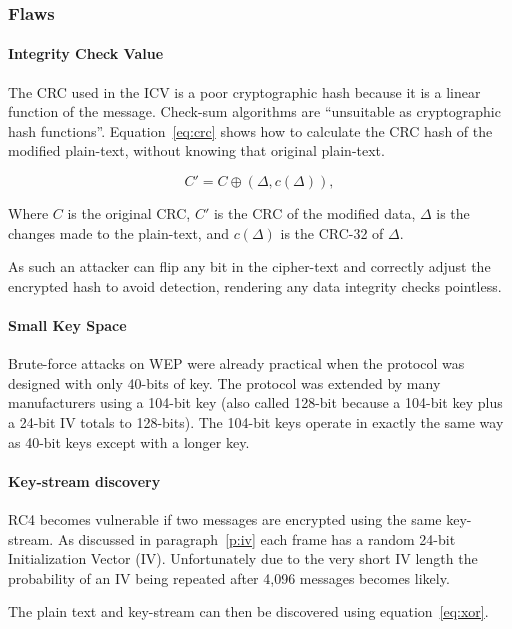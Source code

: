 \documentclass[pdftex, 12pt, a4paper]{article}
\begin{document}
\subsubsection{Flaws}

\paragraph{Integrity Check Value}
The CRC used in the ICV is a poor cryptographic hash because it is a linear function of the message. Check-sum algorithms are ``unsuitable as cryptographic hash functions''\cite{wiki-crc}. Equation~\ref{eq:crc} shows how to calculate the CRC hash of the modified plain-text, without knowing that original plain-text.

\begin{equation}\label{eq:crc}
C'=C \oplus (\Delta ,c(\Delta)),
\end{equation}

Where $C$ is the original CRC, $C'$ is the CRC of the modified data, $\Delta$ is the changes made to the plain-text, and $c(\Delta)$ is the CRC-32 of $\Delta$.

As such an attacker can flip any bit in the cipher-text and correctly adjust the encrypted hash to avoid detection, rendering any data integrity checks pointless.

\paragraph{Small Key Space}
Brute-force attacks on WEP were already practical when the protocol was designed with only 40-bits of key.  The protocol was extended by many manufacturers using a 104-bit key (also called 128-bit because a 104-bit key plus a 24-bit IV totals to 128-bits).  The 104-bit keys operate in exactly the same way as 40-bit keys except with a longer key.

\paragraph{Key-stream discovery}
RC4 becomes vulnerable if two messages are encrypted using the same key-stream.  As discussed in paragraph~\ref{p:iv} each frame has a random 24-bit Initialization Vector (IV).  Unfortunately due to the very short IV length the probability of an IV being repeated after 4,096 messages becomes likely.

The plain text and key-stream can then be discovered using equation~\ref{eq:xor}.
\end{document}
